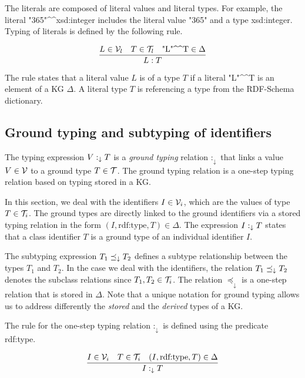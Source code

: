 \documentclass[runningheads]{llncs}
\newcommand{\darr}{\downarrow}
\newcommand{\V}{{\cal V}}
\newcommand{\T}{{\cal T}}
\begin{document}
The literals are composed of literal values and literal types. For
example, the literal
"365"\textasciicircum\textasciicircum\/xsd:integer includes the
literal value "365" and a type xsd:integer. Typing of literals is
defined by the following rule.

\begin{equation}
\dfrac{L\in\V_l\quad T\in\T_l\quad \text{"L"\textasciicircum\textasciicircum\/T}\in\Delta}
      {L:T}  
\end{equation}

The rule states that a literal value $L$ is of a type $T$ if a literal
"L"\textasciicircum\textasciicircum\/T is an element of a KG
$\Delta$. A literal type $T$ is referencing a type from the RDF-Schema
dictionary.






\subsection{Ground typing and subtyping of identifiers\label{sec:idents-stored}}

The typing expression $V:_\darr\/T$ is a \emph{ground typing} relation
$:_\darr$ that links a value $V\in\V$ to a ground type $T\in\T$. The
ground typing relation is a one-step typing relation based on typing
stored in a KG.

In this section, we deal with the identifiers $I\in\V_i$, which are the
values of type $T\in\T_i$. The ground types are directly linked to the
ground identifiers via a stored typing relation in the form
$(I,\text{rdf:type},T)\in\Delta$. The expression $I:_\darr\/T$ states that a
class identifier $T$ is a ground type of an individual identifier $I$.

The subtyping expression $T_1\preceq_\darr\/T_2$ defines a subtype
relationship between the types $T_1$ and $T_2$. In the case we deal
with the identifiers, the relation $T_1\preceq_\darr\/T_2$ denotes the
subclass relations since $T_1,T_2\in\T_i$. The relation $\preceq_\darr$ is
a one-step relation that is stored in $\Delta$. Note that a unique
notation for ground typing allows us to address differently the
\emph{stored} and the \emph{derived} types of a KG.

The rule for the one-step typing relation $:_\darr$ is defined using the
predicate rdf:type.

\begin{equation}
\label{rul:ident-1step-type}
\dfrac{I\in\V_i\quad T\in\T_i\quad (I,\text{rdf:type},T)\in\D}
      {I :_\darr T}
\end{equation}
\end{document}
